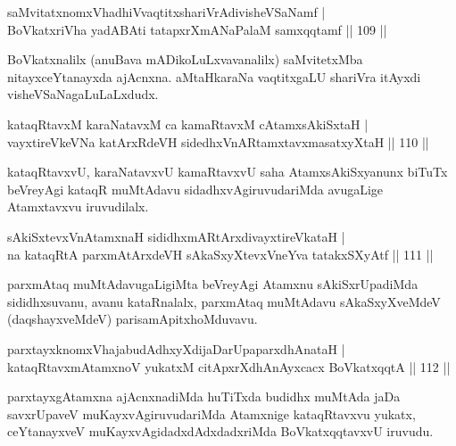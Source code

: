 \begin{shl}
saMvitatxnomxVhadhiVvaqtitxshariVrAdivisheVSaNamf |\\
BoVkatxriVha yadABAti tatapxrXmANaPalaM samxqqtamf \hfill || 109 ||
\end{shl}

\begin{artha}
BoVkatxnalilx (anuBava mADikoLuLxvavanalilx) saMvitetxMba nitayxceYtanayxda ajAcnxna. aMtaHkaraNa vaqtitxgaLU shariVra itAyxdi visheVSaNagaLuLaLxdudx. 
\end{artha}

\begin{shl}
kataqRtavxM karaNatavxM ca kamaRtavxM cA\s \s tamxsAkiSxtaH |\\
vayxtireVkeVNa katArxRdeVH sidedhxVnAR\s \s tamxtavxmasatxyXtaH \hfill || 110 ||
\end{shl}

\begin{artha}%
kataqRtavxvU, karaNatavxvU kamaRtavxvU saha AtamxsAkiSxyanunx biTuTx beVreyAgi kataqR muMtAdavu sidadhxvAgiruvudariMda avugaLige Atamxtavxvu iruvudilalx.
\end{artha}


\begin{shl}
sAkiSxtevxVnA\s \s tamxnaH sididhxmARtArxdivayxtireVkataH |\\
na kataqRtA parxmAtArxdeVH sAkaSxyXtevxVneYva tatakxSXyAtf \hfill || 111 ||
\end{shl}

\begin{artha}
parxmAtaq muMtAdavugaLigiMta beVreyAgi Atamxnu sAkiSxrUpa\-diMda sididhxsuvanu, avanu kataRnalalx, parxmAtaq muMtAdavu sAkaSxyXveMdeV (daqshayxveMdeV) parisamApitxhoMduvavu.
\end{artha}


\begin{shl}
parxtayxknomxVhajabudAdhxyXdijaDarUpaparxdhAnataH |\\
kataqRtavxmAtamxnoV yukatxM citApxrXdhAnAyxcacx BoVkatxqqtA \hfill || 112 ||
\end{shl}

\begin{artha}
parxtayxgAtamxna ajAcnxnadiMda huTiTxda budidhx muMtAda jaDa savxrUpaveV muKayxvAgiruvudariMda Atamxnige kataqRtavxvu yukatx, ceYtanayxveV muKayxvAgidadxdAdxdadxriMda BoVkatxqqtavxvU iruvudu. 
\end{artha}

